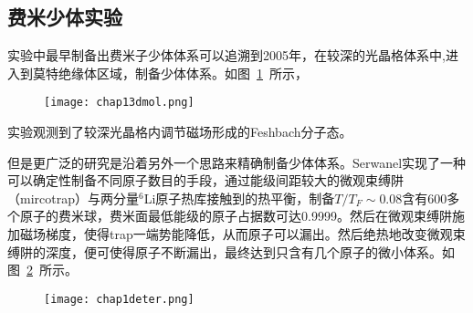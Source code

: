 \subsection{费米少体实验}
实验中最早制备出费米子少体体系可以追溯到2005年，在较深的光晶格体系中,进入到莫特绝缘体区域，制备少体体系\cite{greiner2002quantum,EsslingerFermiSea,Esslinger1DMol,Esslinger3DMol,Ospelkaus3DMol,Hecker3DMol,SalaCIRMol}。如图~\ref{3dmol}~所示，
\begin{figure}[!htbp]
    \centering
    \texttt{[image: chap13dmol.png]}
    \label{3dmol}
\end{figure}
实验观测到了较深光晶格内调节磁场形成的Feshbach分子态。

但是更广泛的研究是沿着另外一个思路来精确制备少体体系\cite{SerwaneDeterministic,zurn2012fermionization,WenzFermiSeaOnebyOne,Zurn2013Pairing,MurmannSpinChain,MurmannTwoFermionDoubleWell,RontaniTunneling}。Serwanel实现了一种可以确定性制备不同原子数目的手段\cite{SerwaneDeterministic}，通过能级间距较大的微观束缚阱（mircotrap）与两分量${}^6$Li原子热库接触到的热平衡，制备$T/T_F\sim0.08$含有600多个原子的费米球，费米面最低能级的原子占据数可达0.9999。然后在微观束缚阱施加磁场梯度，使得trap一端势能降低，从而原子可以漏出。然后绝热地改变微观束缚阱的深度，便可使得原子不断漏出，最终达到只含有几个原子的微小体系。如图~\ref{deter}~所示。
\begin{figure}[!htbp]
    \centering
    \texttt{[image: chap1deter.png]}
    \label{deter}
\end{figure}

